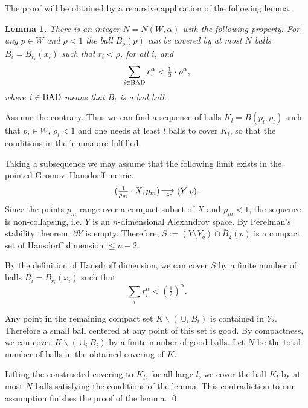 \documentclass[12pt,leqno,intlimits]{amsart}
\numberwithin{equation}{section}
\newtheorem{lem}[thm]{Lemma}
\theoremstyle{definition}
\theoremstyle{remark}
\def\BAD{\mathop{\rm BAD}\nolimits}%
\newcommand*{\GHto}{\mathbin{\begin{picture}(16,3.5)
\put(-1,1){$\longrightarrow$}
\put(13,-3){\llap{\text{\sf\tiny GH}}}
\end{picture}}}
\def\parit#1{\medskip\noindent{\it #1}}
\def\qeds{\qed\par\medskip}
\begin{document}
The proof will be obtained by a recursive application of the following lemma.

\begin{lem}\label{lem:covering}
There is an integer $N =N(W,\alpha) $ with the following property. For any $p\in W$ and $\rho < 1$
the ball $B_{\rho}(p)$ can be covered by at most $N$ balls
$B_i=B_{r_i}(x_i)$ such that $r_i <\rho$, for all $i$, and
$$ \sum_{i\in \BAD}r_i^{\alpha}< \tfrac12\cdot \rho^{\alpha}  ,$$
where $i\in \BAD$ means that $B_i$ is a bad ball.
\end{lem}

\parit{Proof.}
Assume the contrary. Thus we can find a sequence of balls
$K_l=B(p_l,\rho_l)$
such that $p_l\in W$,
$\rho_l<1$ and
one needs at least $l$ balls to cover $K_l$, so that the conditions in the lemma are fulfilled.

Taking a subsequence we may assume that the following limit exists in the pointed Gromov--Hausdorff metric.
$$(\tfrac1{\rho_m}\cdot X,p_m)\GHto (Y,p).$$
Since the points $p_m$ range over a compact subset of $X$ and $\rho _m <1$, the
sequence is non-collapsing, i.e. $Y$ is an $n$-dimensional Alexandrov space.
By Perelman's stability theorem, $\partial Y$ is empty.
Therefore, $S:= (Y\setminus Y_{\delta} ) \cap \bar B_2 (p)$ is a compact set of Hausdorff dimension $\le n-2$.

By the definition of Hausdroff dimension, we can cover $S$ by a finite number of balls
$B_i=B_{r_i}(x_i)$ such that
$$\sum_ir_i^{\alpha} < (\tfrac12)^{\alpha}.$$

Any point in the remaining compact set $K\backslash (\cup_i B_i)$
is contained in $Y_{\delta}$. Therefore a small ball centered at any point of this set is good.
By compactness, we can cover $K\backslash (\cup_i B_i)$ by a finite number of good balls.
Let $N$ be the total number of balls in the obtained covering of $K$.

Lifting the constructed covering to $K_l$, for all large $l$,
we cover
the ball $K_l$ by at most $N$ balls satisfying the conditions of the lemma.
This contradiction to our assumption finishes the proof of the lemma.
\qeds
\end{document}
